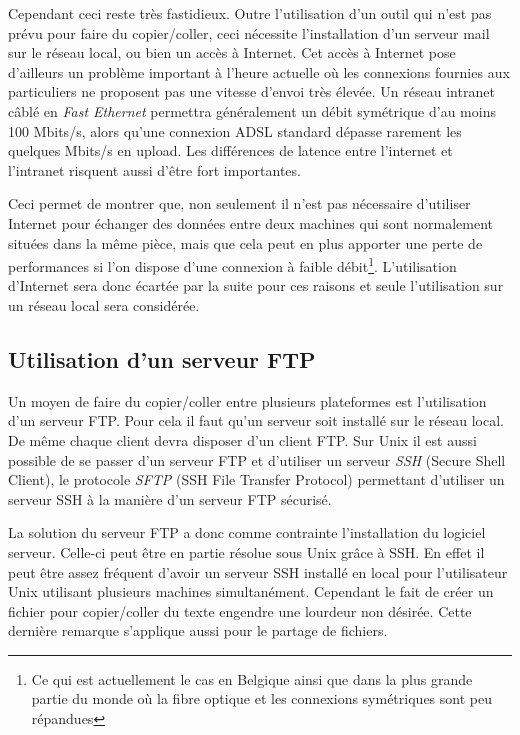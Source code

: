 Cependant ceci reste très fastidieux. Outre l'utilisation d'un outil
qui n'est pas prévu pour faire du copier/coller, ceci nécessite
l'installation d'un serveur mail sur le réseau local, ou bien un accès à
Internet. Cet accès à Internet pose d'ailleurs un problème important
à l'heure actuelle où les connexions fournies aux particuliers ne
proposent pas une vitesse d'envoi très élevée. Un réseau intranet câblé
en \emph{Fast Ethernet} permettra généralement un débit symétrique d'au
moins 100 Mbits/s, alors qu'une connexion ADSL standard dépasse rarement
les quelques Mbits/s en upload. Les différences de latence entre l'internet
et l'intranet risquent aussi d'être fort importantes.

Ceci permet de montrer que, non seulement il n'est pas nécessaire
d'utiliser Internet pour échanger des données entre deux machines
qui sont normalement situées dans la même pièce, mais que cela peut
en plus apporter une perte de performances si l'on dispose d'une
connexion à faible débit\footnote{Ce qui est actuellement le cas en Belgique
ainsi que dans la plus grande partie du monde où la fibre optique et
les connexions symétriques sont peu répandues}.
L'utilisation d'Internet sera donc écartée par
la suite pour ces raisons et seule l'utilisation sur un réseau local
sera considérée.

\subsection{Utilisation d'un serveur FTP}
Un moyen de faire du copier/coller entre plusieurs plateformes
est l'utilisation d'un serveur FTP. Pour cela il faut qu'un
serveur soit installé sur le réseau local. De même chaque client
devra disposer d'un client FTP. Sur Unix il est aussi possible de se passer
d'un serveur FTP et d'utiliser un serveur \emph{SSH} (Secure Shell Client),
le protocole \emph{SFTP} (SSH File Transfer Protocol) permettant
d'utiliser un serveur SSH à la manière d'un serveur FTP sécurisé.

La solution du serveur FTP a donc comme contrainte l'installation du logiciel
serveur. Celle-ci peut être en partie résolue sous Unix grâce à SSH.
En effet il peut être assez fréquent d'avoir un serveur SSH installé
en local pour l'utilisateur Unix utilisant plusieurs machines simultanément.
Cependant le fait de créer un fichier pour copier/coller du texte engendre
une lourdeur non désirée. Cette dernière remarque s'applique aussi pour
le partage de fichiers.

